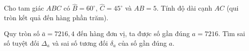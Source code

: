 \begin{bt}%
	Cho tam giác $A B C$ có $\widehat{B}=60^{\circ}$, $\widehat{C}=45^{\circ}$ và $AB=5$. Tính độ dài cạnh $AC$ (qui tròn kết quả đến hàng phần trăm).
\end{bt} 



\begin{bt}%
	Quy tròn số $\bar{a}=7216{,}4$ đến hàng đơn vị, ta được số gần đúng $a=7216$. Tìm sai số tuyệt đối $\Delta_a$ và sai số tương đối $\delta_a$ của số gần đúng $a$.
\end{bt} 



